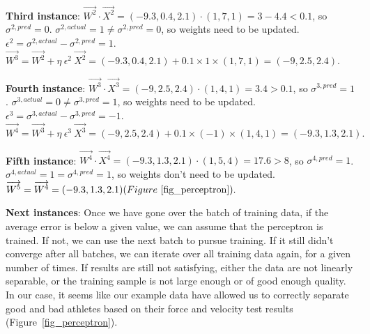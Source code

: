 \begin{tcolorbox}[colback=white,colframe=black, colbacktitle=white, coltitle=black, breakable, title=\textbf{Example 1} Athlete classification with a perceptron, label=example1]
      \textbf{Third instance}: \(\overrightarrow{W^2} \cdot \overrightarrow{X^2} = (-9.3,0.4,2.1) \cdot (1,7,1) = 3-4.4 < 0.1\), so $\sigma^{2, pred} = 0$. \newline
      \(\sigma^{2, actual} = 1 \neq \sigma^{2, pred} = 0\), so weights need to be updated.\newline 
      \(\epsilon^2 = \sigma^{2,actual} - \sigma^{2,pred} = 1\).\newline
      \(\overrightarrow{W^3} = \overrightarrow{W^2} + \eta \ \epsilon^2 \ \overrightarrow{X^2} = (-9.3,0.4,2.1) + 0.1 \times 1 \times (1,7,1) = (-9,2.5,2.4).\)\newline
      
      \textbf{Fourth instance}: \(\overrightarrow{W^3} \cdot \overrightarrow{X^3} = (-9,2.5,2.4) \cdot (1,4,1) = 3.4 > 0.1\), so $\sigma^{3, pred} = 1$. \newline
      \(\sigma^{3, actual} = 0 \neq \sigma^{3, pred} = 1\), so weights need to be updated.\newline
      \(\epsilon^3 = \sigma^{3,actual} - \sigma^{3,pred} = -1\).\newline
      \(\overrightarrow{W^4} = \overrightarrow{W^3} + \eta \ \epsilon^3 \ \overrightarrow{X^3} = (-9,2.5,2.4) + 0.1 \times (-1) \times (1,4,1) = (-9.3,1.3,2.1).\)\newline
      
      \newpage

      \textbf{Fifth instance}: \(\overrightarrow{W^4} \cdot \overrightarrow{X^4} = (-9.3,1.3,2.1) \cdot (1, 5, 4) = 17.6 > 8\), so $\sigma^{4, pred} = 1$. \newline
      \(\sigma^{4, actual} = 1 = \sigma^{4, pred} = 1\), so weights don't need to be updated.\newline
      \(\overrightarrow{W^5} = \overrightarrow{W^4} = (-9.3,1.3,2.1) (Figure~\ref{fig_perceptron}). \)\newline

      \textbf{Next instances}: Once we have gone over the batch of training data, if the average error is below a given value, we can assume that the perceptron is trained. If not, we can use the next batch to pursue training. If it still didn't converge after all batches, we can iterate over all training data again, for a given number of times. If results are still not satisfying, either the data are not linearly separable, or the training sample is not large enough or of good enough quality. In our case, it seems like our example data have allowed us to correctly separate good and bad athletes based on their force and velocity test results (Figure~\ref{fig_perceptron}).


\end{tcolorbox}
